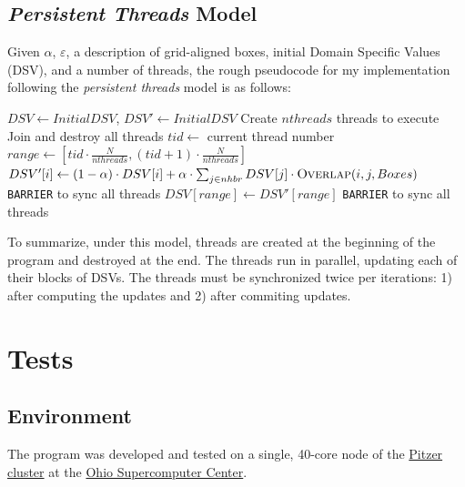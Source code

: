 \documentclass{article}
\begin{document}
\subsection*{\emph{Persistent Threads} Model}

Given $\alpha$, $\varepsilon$, a description of grid-aligned boxes, initial
Domain Specific Values (DSV), and a number of threads, the rough pseudocode for
my implementation following the \emph{persistent threads} model is as follows:

\begin{algorithm}
\begin{algorithmic}[1]
\State $DSV \gets Initial DSV$, $DSV' \gets Initial DSV$
\State Create $nthreads$ threads to execute 
\State Join and destroy all threads
\EndProcedure
{}
    \State $tid \gets$ current thread number
    \State $range \gets [ tid\cdot \frac{N}{nthreads}, (tid + 1)\cdot \frac{N}{nthreads} ]$
            \State $DSV'[i] \gets (1 - \alpha)\cdot DSV[i] + \alpha \cdot \sum_{j\in nhbr} DSV[j]\cdot \Call{Overlap}{i, j, Boxes}$
        \EndFor
        \State \texttt{BARRIER} to sync all threads
        \State $DSV[range] \gets DSV'[range]$
        \State \texttt{BARRIER} to sync all threads
    \EndWhile
\EndProcedure
\end{algorithmic}
\end{algorithm}

To summarize, under this model, threads are created at the beginning of the
program and destroyed at the end. The threads run in parallel, updating each of
their blocks of DSVs. The threads must be synchronized twice per iterations: 1)
after computing the updates and 2) after commiting updates.

\section*{Tests}
\label{sec:tests}

\subsection*{Environment}
\label{subsec:environment}

The program was developed and tested on a single, 40-core node of the
\href{https://www.osc.edu/resources/technical_support/supercomputers/pitzer}{Pitzer
cluster} at the \href{https://www.osc.edu/}{Ohio Supercomputer Center}.
\end{document}
